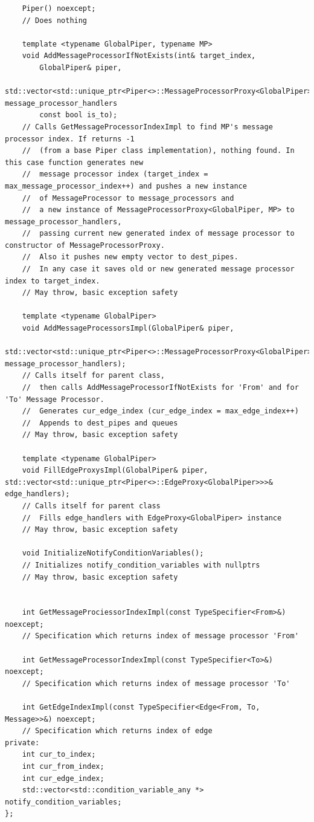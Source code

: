 \documentclass{article}
\begin{document}
\begin{lstlisting}
	Piper() noexcept;
	// Does nothing

	template <typename GlobalPiper, typename MP>
	void AddMessageProcessorIfNotExists(int& target_index,
		GlobalPiper& piper,
		std::vector<std::unique_ptr<Piper<>::MessageProcessorProxy<GlobalPiper>>>& message_processor_handlers
		const bool is_to);
	// Calls GetMessageProcessorIndexImpl to find MP's message processor index. If returns -1
	// 	(from a base Piper class implementation), nothing found. In this case function generates new
	//	message processor index (target_index = max_message_processor_index++) and pushes a new instance
	//	of MessageProcessor to message_processors and
	//	a new instance of MessageProcessorProxy<GlobalPiper, MP> to message_processor_handlers,
	//	passing current new generated index of message processor to constructor of MessageProcessorProxy.
	//	Also it pushes new empty vector to dest_pipes.
	//	In any case it saves old or new generated message processor index to target_index.
	// May throw, basic exception safety

	template <typename GlobalPiper>
	void AddMessageProcessorsImpl(GlobalPiper& piper,
		std::vector<std::unique_ptr<Piper<>::MessageProcessorProxy<GlobalPiper>>>& message_processor_handlers);
	// Calls itself for parent class,
	//	then calls AddMessageProcessorIfNotExists for 'From' and for 'To' Message Processor.
	//	Generates cur_edge_index (cur_edge_index = max_edge_index++)
	//	Appends to dest_pipes and queues
	// May throw, basic exception safety

	template <typename GlobalPiper>
	void FillEdgeProxysImpl(GlobalPiper& piper, std::vector<std::unique_ptr<Piper<>::EdgeProxy<GlobalPiper>>>& edge_handlers);
	// Calls itself for parent class
	//	Fills edge_handlers with EdgeProxy<GlobalPiper> instance
	// May throw, basic exception safety

	void InitializeNotifyConditionVariables();
	// Initializes notify_condition_variables with nullptrs
	// May throw, basic exception safety


	int GetMessageProciessorIndexImpl(const TypeSpecifier<From>&) noexcept;
	// Specification which returns index of message processor 'From'

	int GetMessageProcessorIndexImpl(const TypeSpecifier<To>&) noexcept;
	// Specification which returns index of message processor 'To'

	int GetEdgeIndexImpl(const TypeSpecifier<Edge<From, To, Message>>&) noexcept;
	// Specification which returns index of edge
private:
	int cur_to_index;
	int cur_from_index;
	int cur_edge_index;
	std::vector<std::condition_variable_any *> notify_condition_variables;
};
\end{lstlisting}
\end{document}
